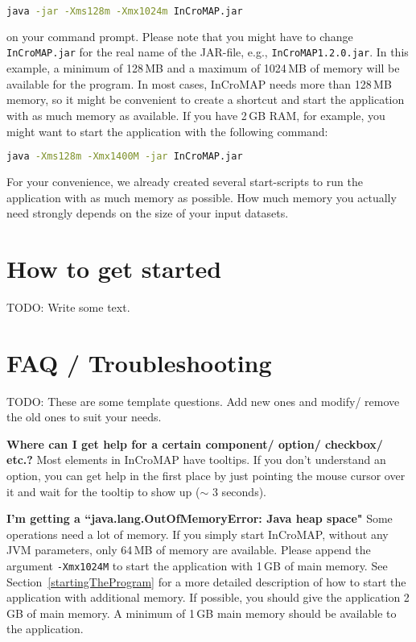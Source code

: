 \begin{lstlisting}[language=bash,numbers=none]
java -jar -Xms128m -Xmx1024m InCroMAP.jar
\end{lstlisting}

\noindent on your command prompt. Please note that you might have to change
\texttt{InCroMAP.jar} for the real name of the JAR-file, e.g.,
\texttt{InCroMAP1.2.0.jar}. In this example, a minimum of 128\,MB and a maximum
of 1024\,MB of memory will be available for the program. In most cases,
InCroMAP needs more than 128\,MB memory, so it might be convenient to create a
shortcut and start the application with as much memory as available. If you
have 2\,GB RAM, for example, you might want to start the application with the
following command:

\begin{lstlisting}[language=bash,numbers=none]
java -Xms128m -Xmx1400M -jar InCroMAP.jar
\end{lstlisting}

For your convenience, we already created several start-scripts to run the
application with as much memory as possible. How much memory you actually need
strongly depends on the size of your input datasets.
%

\chapter{How to get started}

TODO: Write some text.


\chapter{FAQ / Troubleshooting}
\label{ch:faq}

TODO: These are some template questions. Add new ones and modify/ remove the
old ones to suit your needs.

\noindent \textbf{Where can I get help for a certain component/ option/ checkbox/ etc.?}\newline
Most elements in InCroMAP have tooltips. If you don't understand an option, you
can get help in the first place by just pointing the mouse cursor over it and
wait for the tooltip to show up ($\sim$ 3 seconds).\newline

\noindent \textbf{I'm getting a ``java.lang.OutOfMemoryError: Java heap space"}\newline
Some operations need a lot of memory. If you simply start InCroMAP, without any
JVM parameters, only 64\,MB of memory are available. Please append the argument
\texttt{-Xmx1024M} to start the application with 1\,GB of main memory. See
Section~\vref{startingTheProgram} for a more detailed description of how to
start the application with additional memory. If possible, you should give the
application 2\,GB of main memory. A minimum of 1\,GB main memory should be
available to the application.\newline

